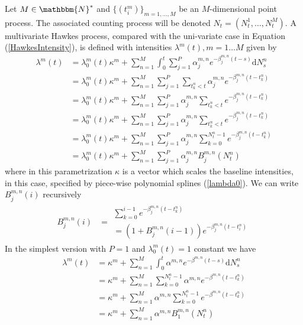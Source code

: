 \documentclass{amsart}
\newcommand{\mathd}{\mathrm{d}}
\begin{document}
Let $M \in \mathbbm{N}^{\ast}$ and $\{ ( t_i^m) \}_{m = 1, \ldots, M}$ be an
$M$-dimensional point process. The associated counting process will be denoted
$N_t = ( N_t^1, \ldots, N_t^M)$. A multivariate Hawkes
process{\cite{hawkes1971spectra}}{\cite{embrechts2011multivariate}}{\cite{liniger2009multivariate}},
compared with the uni-variate case in Equation (\ref{HawkesIntensity}), is
defined with intensities $\lambda^m ( t), m = 1 \ldots M$ given by
\begin{equation}
  \begin{array}{ll}
    \lambda^m ( t) & = \lambda_0^m ( t) \kappa^m + \sum_{n = 1}^M \int_0^t
    \sum_{j = 1}^P \alpha_j^{m, n} e^{- \beta_j^{m, n} ( t - s)} \mathd
    N_s^n\\
    & = \lambda_0^m ( t) \kappa^m + \sum_{n = 1}^M \sum_{j = 1}^P
    \sum^{}_{t_k^n < t} \alpha_j^{m, n} e^{- \beta_j^{m, n} ( t - t_k^n)}\\
    & = \lambda_0^m ( t) \kappa^m + \sum_{n = 1}^M \sum_{j = 1}^P
    \alpha_j^{m, n} \sum_{t_k^n < t} e^{- \beta_j^{m, n} ( t - t_k^n)}_{}\\
    & = \lambda_0^m ( t) \kappa^m + \sum_{n = 1}^M \sum_{j = 1}^P
    \alpha_j^{m, n} \sum_{t_k^n < t} e^{- \beta_j^{m, n} ( t - t_k^n)}_{}\\
    & = \lambda_0^m ( t) \kappa^m + \sum_{n = 1}^M \sum_{j = 1}^P
    \alpha_j^{m, n} \sum_{k = 0}^{N_t^n - 1} e^{- \beta_j^{m, n} ( t -
    t_k^n)}\\
    & = \lambda_0^m ( t) \kappa^m + \sum_{n = 1}^M \sum_{j = 1}^P
    \alpha_j^{m, n} B_j^{m, n} ( N_t^n)
  \end{array} \label{mhi}
\end{equation}
where in this parametrization $\kappa$ is a vector which scales the baseline
intensities, in this case, specified by piece-wise polynomial splines
(\ref{lambda0}). We can write $B_j^{m, n} ( i)$ recursively
\begin{equation}
  \begin{array}{ll}
    B_j^{m, n} ( i) & = \begin{array}{l}
      \sum^{i - 1}_{k = 0} e^{- \beta_j^{m, n} ( t - t_k^n)}\\
      = ( 1 + B^{m, n}_j ( i - 1)) e^{- \beta^{m, n}_j ( t - t^n_i)}
    \end{array}
  \end{array}
\end{equation}
In the simplest version with $P = 1$ and $\lambda_0^m ( t) = 1$ constant we
have
\begin{equation}
  \begin{array}{ll}
    \lambda^m ( t) & = \kappa^m + \sum_{n = 1}^M \int_0^t \alpha^{m, n} e^{-
    \beta^{m, n} ( t - s)} \mathd N_s^n \\
    & = \kappa^m + \sum_{n = 1}^M \sum^{N_t^n - 1}_{k = 0} \alpha^{m, n} e^{-
    \beta^{m, n} ( t - t_k^n)}\\
    & = \kappa^m + \sum_{n = 1}^M \alpha^{m, n} \sum^{N_t^n - 1}_{k = 0} e^{-
    \beta^{m, n} ( t - t_k^n)}\\
    & = \kappa^m + \sum_{n = 1}^M \alpha^{m, n} B_1^{m, n} ( N^n_t)
  \end{array} \label{mhp1}
\end{equation}
\end{document}
